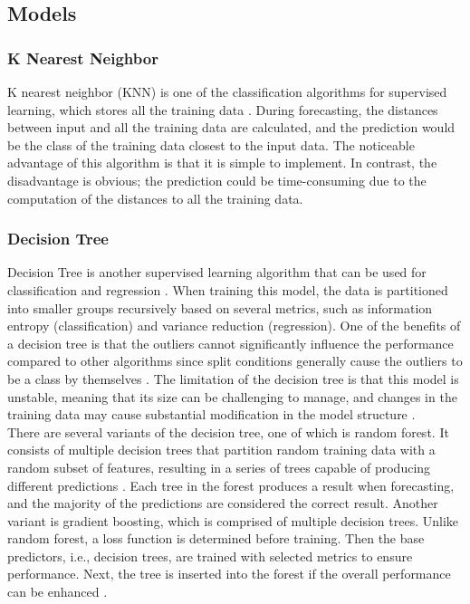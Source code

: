 \documentclass[12pt,twoside]{report}
\begin{document}
\subsection{Models}
\subsubsection{K Nearest Neighbor}
K nearest neighbor (KNN) is one of the classification algorithms for supervised learning, which stores all the training data \citep{RN33}. During forecasting, the distances between input and all the training data are calculated, and the prediction would be the class of the training data closest to the input data. The noticeable advantage of this algorithm is that it is simple to implement. In contrast, the disadvantage is obvious; the prediction could be time-consuming due to the computation of the distances to all the training data. 

\subsubsection{Decision Tree}
Decision Tree is another supervised learning algorithm that can be used for classification and regression \citep{RN33}. When training this model,  the data is partitioned into smaller groups recursively based on several metrics, such as information entropy (classification) and variance reduction (regression). One of the benefits of a decision tree is that the outliers cannot significantly influence the performance compared to other algorithms since split conditions generally cause the outliers to be a class by themselves \citep{RN31}. The limitation of the decision tree is that this model is unstable, meaning that its size can be challenging to manage, and changes in the training data may cause substantial modification in the model structure \citep{RN33}. 
\\

There are several variants of the decision tree, one of which is random forest. It consists of multiple decision trees that partition random training data with a random subset of features, resulting in a series of trees capable of producing different predictions \citep{RN34}. Each tree in the forest produces a result when forecasting, and the majority of the predictions are considered the correct result. Another variant is gradient boosting, which is comprised of multiple decision trees. Unlike random forest, a loss function is determined before training. Then the base predictors, i.e., decision trees, are trained with selected metrics to ensure performance. Next, the tree is inserted into the forest if the overall performance can be enhanced \citep{RN35}. 
\end{document}
